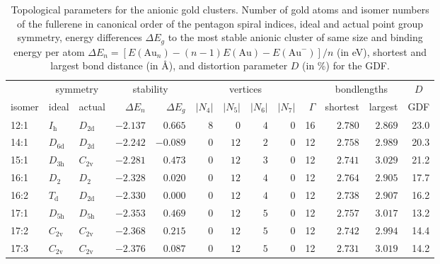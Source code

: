 \begin{table}[htbp]
	\centering
    \setlength{\tabcolsep}{1.5pt}
    \footnotesize{
    \caption{Topological parameters for the anionic gold clusters. Number of
    gold atoms and isomer numbers of the fullerene in canonical order of the
    pentagon spiral indices,\autocite{Fowler-atlas-2006} ideal and actual point
    group symmetry, energy differences $\Delta E_g$ to the most stable anionic
    cluster of same size and binding energy per atom $\Delta E_n =
    [E(\textrm{Au}_n)-(n-1)E(\textrm{Au})-E(\textrm{Au}^-)]/n$  (in eV),
    shortest and largest bond distance (in \AA), and distortion parameter $D$
    (in \%) for the \acs{GDF}. }
	\label{tab:anion}
\begin{tabular}{lllrrrrrrrrrr}
\toprule
\multicolumn{1}{c}{  } & \multicolumn{2}{c}{ symmetry  }  & \multicolumn{2}{c}{stability} & \multicolumn{4}{c}{ vertices } & & \multicolumn{2}{c}{ bondlengths } &  \multicolumn{1}{c}{$D$} \\
isomer & ideal  & actual  & $\Delta E_n$ &$\Delta E_g$ & \multicolumn{1}{c}{$|N_4|$} & \multicolumn{1}{c}{$|N_5|$} & \multicolumn{1}{c}{$|N_6|$} & \multicolumn{1}{c}{$|N_7|$}& $\Gamma$ & shortest & largest   & GDF  \\\midrule
    12:1    & $I_\mathrm{h}$  & $D_\mathrm{2d}$ & $-2.137$ & $0.665$  & $8$ & $0$  & $4$  & $0$ & 16 & $2.780$ & $2.869$ & 23.0  \\
    14:1    & $D_\mathrm{6d}$ & $D_\mathrm{2d}$ & $-2.242$ & $-0.089$ & $0$ & $12$ & $2$  & $0$ & 12 & $2.758$ & $2.989$ & 20.3  \\
    15:1    & $D_\mathrm{3h}$ & $C_\mathrm{2v}$ & $-2.281$ & $0.473$  & $0$ & $12$ & $3$  & $0$ & 12 & $2.741$ & $3.029$ & 21.2  \\
    16:1    & $D_\mathrm{2}$  & $D_\mathrm{2 }$ & $-2.328$ & $0.020$  & $0$ & $12$ & $4$  & $0$ & 12 & $2.764$ & $2.905$ & 17.7  \\
    16:2    & $T_\mathrm{d}$  & $D_\mathrm{2d}$ & $-2.330$ & $0.000$  & $0$ & $12$ & $4$  & $0$ & 12 & $2.738$ & $2.907$ & 16.2  \\
    17:1    & $D_\mathrm{5h}$ & $D_\mathrm{5h}$ & $-2.353$ & $0.469$  & $0$ & $12$ & $5$  & $0$ & 12 & $2.757$ & $3.017$ & 13.2  \\
    17:2    & $C_\mathrm{2v}$ & $C_\mathrm{2v}$ & $-2.368$ & $0.215$  & $0$ & $12$ & $5$  & $0$ & 12 & $2.742$ & $2.994$ & 14.4  \\
    17:3    & $C_\mathrm{2v}$ & $C_\mathrm{2v}$ & $-2.376$ & $0.087$  & $0$ & $12$ & $5$  & $0$ & 12 & $2.731$ & $3.019$ & 14.2  \\

\end{tabular}}
\end{table}

